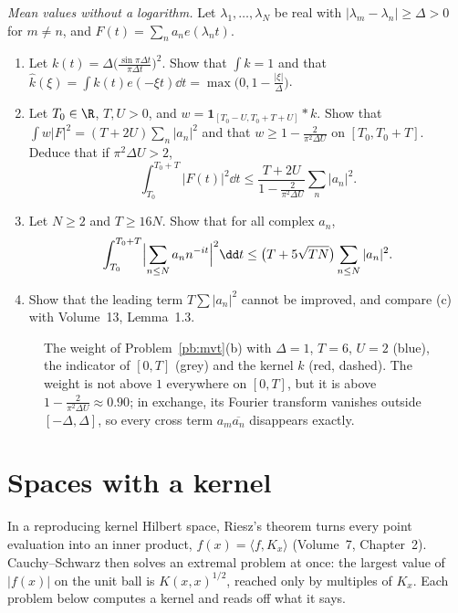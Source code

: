 \begin{exercise}[Journey]\label{pb:mvt}
\emph{Mean values without a logarithm.} Let $\lambda_1,\dots,\lambda_N$ be real with $|\lambda_m-\lambda_n|\ge\Delta>0$ for $m\ne n$, and $F(t)=\sum_na_ne(\lambda_nt)$.
\begin{enumerate}[label=(\alph*)]
\item Let $k(t)=\Delta\bigl(\frac{\sin\pi\Delta t}{\pi\Delta t}\bigr)^2$. Show that $\int k=1$ and that $\hat k(\xi)=\int k(t)e(-\xi t)\dd t=\max\bigl(0,1-\frac{|\xi|}\Delta\bigr)$.
\item Let $T_0\in\R$, $T,U>0$, and $w=\mathbf 1_{[T_0-U,T_0+T+U]}*k$. Show that $\int w|F|^2=(T+2U)\sum_n|a_n|^2$ and that
$w\ge1-\frac2{\pi^2\Delta U}$ on $[T_0,T_0+T]$. Deduce that if $\pi^2\Delta U>2$,
\[
\int_{T_0}^{T_0+T}|F(t)|^2\dd t\le\frac{T+2U}{1-\frac2{\pi^2\Delta U}}\sum_n|a_n|^2.
\]
\item Let $N\ge2$ and $T\ge16N$. Show that for all complex $a_n$,
\[
\int_{T_0}^{T_0+T}\Bigl|\sum_{n\le N}a_nn^{-it}\Bigr|^2\dd t\le\bigl(T+5\sqrt{TN}\bigr)\sum_{n\le N}|a_n|^2.
\]
\item Show that the leading term $T\sum|a_n|^2$ cannot be improved, and compare (c) with Volume~13, Lemma~1.3.
\end{enumerate}
\end{exercise}

\begin{figure}[ht]
\centering
{}
\caption{The weight of Problem~\ref{pb:mvt}(b) with $\Delta=1$, $T=6$, $U=2$ (blue), the indicator of $[0,T]$ (grey) and the kernel $k$ (red, dashed). The
weight is not above $1$ everywhere on $[0,T]$, but it is above $1-\frac2{\pi^2\Delta U}\approx0.90$; in exchange, its Fourier transform vanishes outside
$[-\Delta,\Delta]$, so every cross term $a_m\overline{a_n}$ disappears exactly.}\label{fig:majorant}
\end{figure}

\section{Spaces with a kernel}

In a reproducing kernel Hilbert space, Riesz's theorem turns every point evaluation into an inner product, $f(x)=\langle f,K_x\rangle$
(Volume~7, Chapter~2). Cauchy--Schwarz then solves an extremal problem at once: the largest value of $|f(x)|$ on the unit ball is
$K(x,x)^{1/2}$, reached only by multiples of $K_x$. Each problem below computes a kernel and reads off what it says.


